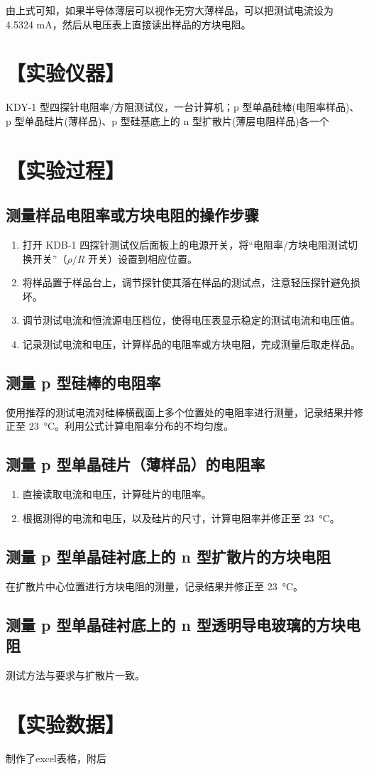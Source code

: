 \documentclass[a4paper,utf8]{article}
\begin{document}
            由上式可知，如果半导体薄层可以视作无穷大薄样品，可以把测试电流设为 4.5324 mA，然后从电压表上直接读出样品的方块电阻。
        
\section*{【实验仪器】}%
    KDY-1 型四探针电阻率/方阻测试仪，一台计算机；p 型单晶硅棒(电阻率样品)、p 型单晶硅片(薄样品)、p 型硅基底上的 n 型扩散片(薄层电阻样品)各一个
    \section*{【实验过程】}
    \subsection*{测量样品电阻率或方块电阻的操作步骤}
    \begin{enumerate}
        \item 打开 KDB-1 四探针测试仪后面板上的电源开关，将“电阻率/方块电阻测试切换开关”（$\rho/R$ 开关）设置到相应位置。
        \item 将样品置于样品台上，调节探针使其落在样品的测试点，注意轻压探针避免损坏。
        \item 调节测试电流和恒流源电压档位，使得电压表显示稳定的测试电流和电压值。
        \item 记录测试电流和电压，计算样品的电阻率或方块电阻，完成测量后取走样品。
    \end{enumerate}
    
    \subsection*{测量 p 型硅棒的电阻率}
    使用推荐的测试电流对硅棒横截面上多个位置处的电阻率进行测量，记录结果并修正至 \SI{23}{\degreeCelsius}。利用公式计算电阻率分布的不均匀度。
    
    \subsection*{测量 p 型单晶硅片（薄样品）的电阻率}
    \begin{enumerate}
        \item 直接读取电流和电压，计算硅片的电阻率。
        \item 根据测得的电流和电压，以及硅片的尺寸，计算电阻率并修正至 \SI{23}{\degreeCelsius}。
    \end{enumerate}
    
    \subsection*{测量 p 型单晶硅衬底上的 n 型扩散片的方块电阻}
    在扩散片中心位置进行方块电阻的测量，记录结果并修正至 \SI{23}{\degreeCelsius}。
    
    \subsection*{测量 p 型单晶硅衬底上的 n 型透明导电玻璃的方块电阻}
    测试方法与要求与扩散片一致。

\section*{【实验数据】}
    制作了excel表格，附后
\end{document}
